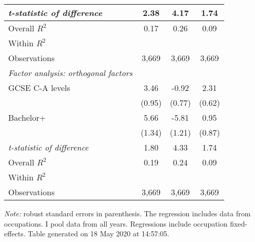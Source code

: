 \begin{center}
\begin{threeparttable}[!h]
\begin{tabular}{lccc}
\textit{t-statistic of difference}&        2.38         &        4.17         &        1.74         \\
\midrule Overall $ R^2$&        0.17         &        0.26         &        0.09         \\
Within $ R^2$       &                     &                     &                     \\
Observations        &       3,669         &       3,669         &       3,669         \\
\midrule \vspace{1mm}\textit{Factor analysis: orthogonal factors} \\ 
\hspace{3mm}GCSE C-A levels&        3.46\sym{***}&       -0.92         &        2.31\sym{***}\\
                    &      (0.95)         &      (0.77)         &      (0.62)         \\
\hspace{3mm}Bachelor+&        5.66\sym{***}&       -5.81\sym{***}&        0.95         \\
                    &      (1.34)         &      (1.21)         &      (0.87)         \\
\textit{t-statistic of difference}&        1.80         &        4.33         &        1.74         \\
\midrule Overall $ R^2$&        0.19         &        0.24         &        0.09         \\
Within $ R^2$       &                     &                     &                     \\
Observations        &       3,669         &       3,669         &       3,669         \\
\bottomrule
\bottomrule
\end{tabular}
\begin{tablenotes}
\item \footnotesize \textit{Note:} robust standard errors in parenthesis. The regression includes data from occupations. I pool data from all years. Regressions include occupation fixed-effects. Table generated on 18 May 2020 at 14:57:05.
\end{tablenotes}
\end{threeparttable}
\end{center}
